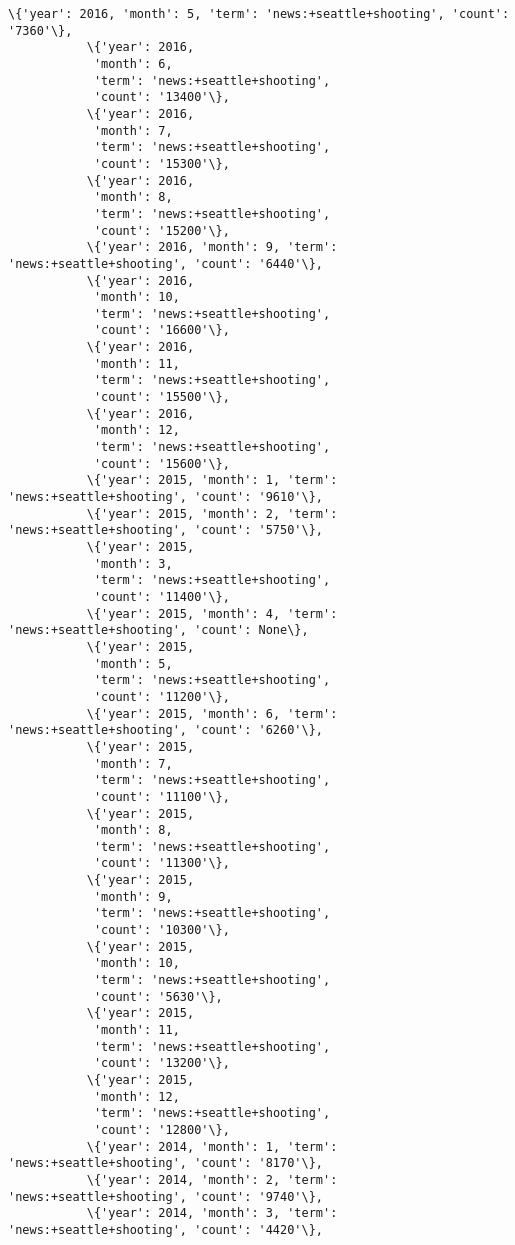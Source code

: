 \documentclass[11pt]{article}
\begin{document}
\begin{Verbatim}[commandchars=\\\{\}]
           \{'year': 2016, 'month': 5, 'term': 'news:+seattle+shooting', 'count': '7360'\},
           \{'year': 2016,
            'month': 6,
            'term': 'news:+seattle+shooting',
            'count': '13400'\},
           \{'year': 2016,
            'month': 7,
            'term': 'news:+seattle+shooting',
            'count': '15300'\},
           \{'year': 2016,
            'month': 8,
            'term': 'news:+seattle+shooting',
            'count': '15200'\},
           \{'year': 2016, 'month': 9, 'term': 'news:+seattle+shooting', 'count': '6440'\},
           \{'year': 2016,
            'month': 10,
            'term': 'news:+seattle+shooting',
            'count': '16600'\},
           \{'year': 2016,
            'month': 11,
            'term': 'news:+seattle+shooting',
            'count': '15500'\},
           \{'year': 2016,
            'month': 12,
            'term': 'news:+seattle+shooting',
            'count': '15600'\},
           \{'year': 2015, 'month': 1, 'term': 'news:+seattle+shooting', 'count': '9610'\},
           \{'year': 2015, 'month': 2, 'term': 'news:+seattle+shooting', 'count': '5750'\},
           \{'year': 2015,
            'month': 3,
            'term': 'news:+seattle+shooting',
            'count': '11400'\},
           \{'year': 2015, 'month': 4, 'term': 'news:+seattle+shooting', 'count': None\},
           \{'year': 2015,
            'month': 5,
            'term': 'news:+seattle+shooting',
            'count': '11200'\},
           \{'year': 2015, 'month': 6, 'term': 'news:+seattle+shooting', 'count': '6260'\},
           \{'year': 2015,
            'month': 7,
            'term': 'news:+seattle+shooting',
            'count': '11100'\},
           \{'year': 2015,
            'month': 8,
            'term': 'news:+seattle+shooting',
            'count': '11300'\},
           \{'year': 2015,
            'month': 9,
            'term': 'news:+seattle+shooting',
            'count': '10300'\},
           \{'year': 2015,
            'month': 10,
            'term': 'news:+seattle+shooting',
            'count': '5630'\},
           \{'year': 2015,
            'month': 11,
            'term': 'news:+seattle+shooting',
            'count': '13200'\},
           \{'year': 2015,
            'month': 12,
            'term': 'news:+seattle+shooting',
            'count': '12800'\},
           \{'year': 2014, 'month': 1, 'term': 'news:+seattle+shooting', 'count': '8170'\},
           \{'year': 2014, 'month': 2, 'term': 'news:+seattle+shooting', 'count': '9740'\},
           \{'year': 2014, 'month': 3, 'term': 'news:+seattle+shooting', 'count': '4420'\},

\end{Verbatim}
\end{document}
